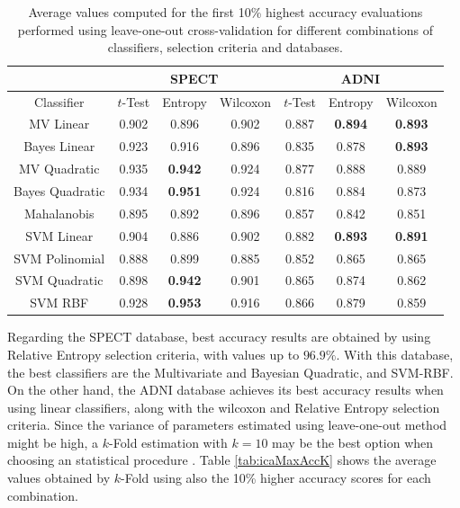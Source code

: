 	\begin{table}[ht]
		\centering
		\begin{tabular}{ccccccc}
			& \multicolumn{3}{c}{SPECT} & \multicolumn{3}{c}{ADNI} \\
			\hline \hline
			Classifier & $t$-Test & Entropy & Wilcoxon & $t$-Test & Entropy & Wilcoxon \\
			\hline \hline
			MV Linear & 0.902 & 0.896 & 0.902 & 0.887 & \textbf{0.894} & \textbf{0.893} \\
			Bayes Linear & 0.923 & 0.916 & 0.896 & 0.835 & 0.878 & \textbf{0.893} \\
			MV Quadratic & 0.935 & \textbf{0.942} & 0.924 & 0.877 & 0.888 & 0.889 \\
			Bayes Quadratic & 0.934 & \textbf{0.951} & 0.924 & 0.816 & 0.884 & 0.873 \\
			Mahalanobis & 0.895 & 0.892 & 0.896 & 0.857 & 0.842 & 0.851 \\
			SVM Linear & 0.904 & 0.886 & 0.902 & 0.882 & \textbf{0.893} & \textbf{0.891} \\
			SVM Polinomial & 0.888 & 0.899 & 0.885 & 0.852 & 0.865 & 0.865 \\
			SVM Quadratic & 0.898 & \textbf{0.942} & 0.901 & 0.865 & 0.874 & 0.862 \\
			SVM RBF & 0.928 & \textbf{0.953} & 0.916 & 0.866 & 0.879 & 0.859 \\
			\hline
			\hline
		\end{tabular}
		\caption{Average values computed for the first 10\% highest accuracy evaluations performed using leave-one-out cross-validation for different combinations of classifiers, selection criteria and databases. }
		\label{tab:icaMaxAcc}
	\end{table}
	
	Regarding the SPECT database, best accuracy results are obtained by using Relative Entropy selection criteria, with values up to $96.9\%$. With this database, the best classifiers are the Multivariate and Bayesian Quadratic, and SVM-RBF. On the other hand, the ADNI database achieves its best accuracy results when using linear classifiers, along with the wilcoxon and Relative Entropy selection criteria. Since the variance of parameters estimated using leave-one-out method might be high, a $k$-Fold estimation with $k=10$ may be the best option when choosing an statistical procedure \cite{Kohavi1995a}. Table \ref{tab:icaMaxAccK} shows the average values obtained by $k$-Fold using also the 10\% higher accuracy scores for each combination.
	
